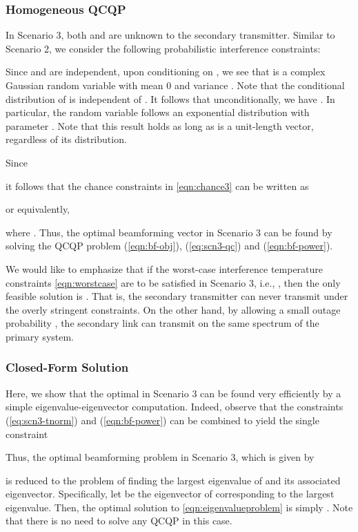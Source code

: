 \documentclass[twocolumn,10pt]{IEEEtran}
\theoremstyle{plain} \newtheorem{theorem}{Theorem}
\theoremstyle{plain} \newtheorem{proposition}{Proposition}
\theoremstyle{plain} \newtheorem{corollary}{Corollary}
\theoremstyle{remark} \newtheorem{remark}{Remark}
\theoremstyle{remark} \newtheorem{lemma}{Lemma}
\theoremstyle{plain} \newtheorem{definition}{Definition}
\theoremstyle{plain} \newtheorem{assumption}{Assumption}
\theoremstyle{plain} \newtheorem{fact}{Fact}
\begin{document}
\subsubsection{\textbf{Homogeneous QCQP}}

In Scenario 3, both  and  are unknown to the secondary transmitter. Similar to Scenario 2, we consider the following probabilistic interference constraints:

Since  and  are independent, upon conditioning on , we see that  is a complex Gaussian random variable with mean 0 and variance . Note that the conditional distribution of  is independent of . It follows that unconditionally, we have .  In particular, the random variable  follows an exponential distribution with parameter .  Note that this result holds as long as  is a unit-length vector, regardless of its distribution.

Since

it follows that the chance constraints in \eqref{eqn:chance3} can be written as

or equivalently,

where .  Thus, the optimal beamforming vector  in Scenario 3 can be found by solving the QCQP problem (\ref{eqn:bf-obj}), (\ref{eq:scn3-qc}) and (\ref{eqn:bf-power}).

We would like to emphasize that if the worst-case interference temperature constraints \eqref{eqn:worstcase} are to be satisfied in Scenario 3, i.e., , then the only feasible solution is . That is, the secondary transmitter can never transmit under the overly stringent constraints. On the other hand, by allowing a small outage probability , the secondary link can transmit on the same spectrum of the primary system.

\subsubsection{\textbf{Closed-Form Solution}}

Here, we show that the optimal  in Scenario 3 can be found very efficiently by a simple eigenvalue-eigenvector computation.  Indeed, observe that the constraints (\ref{eq:scn3-tnorm}) and (\ref{eqn:bf-power}) can be combined to yield the single constraint

Thus, the optimal beamforming problem in Scenario 3, which is given by

is reduced to the problem of finding the largest eigenvalue of  and its associated eigenvector.  Specifically, let  be the eigenvector of  corresponding to the largest eigenvalue.  Then, the optimal solution to \eqref{eqn:eigenvalueproblem} is simply .  Note that there is no need to solve any QCQP in this case.
\end{document}
